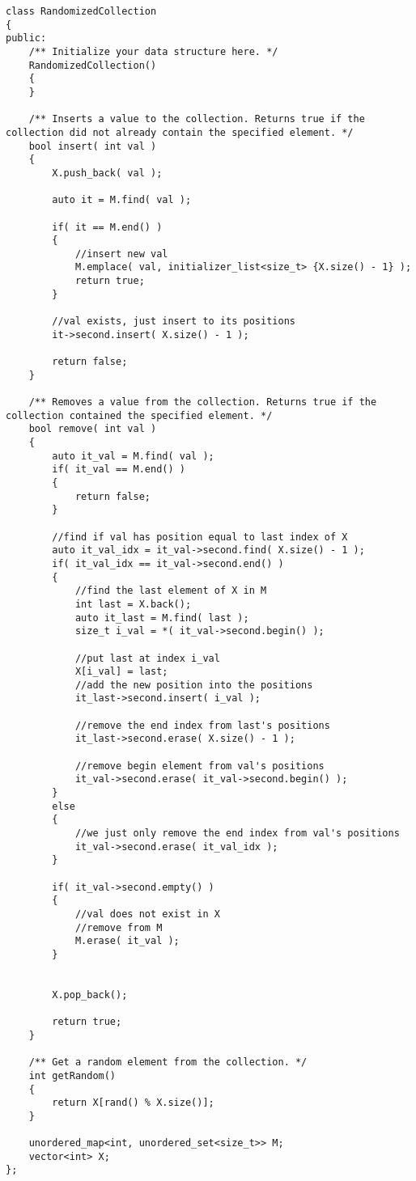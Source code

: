 \setcounter{lstlisting}{0}
\begin{lstlisting}[style=customc, caption={Similar to 380}]
class RandomizedCollection
{
public:
    /** Initialize your data structure here. */
    RandomizedCollection()
    {
    }

    /** Inserts a value to the collection. Returns true if the collection did not already contain the specified element. */
    bool insert( int val )
    {
        X.push_back( val );

        auto it = M.find( val );

        if( it == M.end() )
        {
            //insert new val
            M.emplace( val, initializer_list<size_t> {X.size() - 1} );
            return true;
        }

        //val exists, just insert to its positions
        it->second.insert( X.size() - 1 );

        return false;
    }

    /** Removes a value from the collection. Returns true if the collection contained the specified element. */
    bool remove( int val )
    {
        auto it_val = M.find( val );
        if( it_val == M.end() )
        {
            return false;
        }

        //find if val has position equal to last index of X
        auto it_val_idx = it_val->second.find( X.size() - 1 );
        if( it_val_idx == it_val->second.end() )
        {
            //find the last element of X in M
            int last = X.back();
            auto it_last = M.find( last );
            size_t i_val = *( it_val->second.begin() );

            //put last at index i_val
            X[i_val] = last;
            //add the new position into the positions
            it_last->second.insert( i_val );

            //remove the end index from last's positions
            it_last->second.erase( X.size() - 1 );

            //remove begin element from val's positions
            it_val->second.erase( it_val->second.begin() );
        }
        else
        {
            //we just only remove the end index from val's positions
            it_val->second.erase( it_val_idx );
        }

        if( it_val->second.empty() )
        {
            //val does not exist in X
            //remove from M
            M.erase( it_val );
        }


        X.pop_back();

        return true;
    }

    /** Get a random element from the collection. */
    int getRandom()
    {
        return X[rand() % X.size()];
    }

    unordered_map<int, unordered_set<size_t>> M;
    vector<int> X;
};

\end{lstlisting}

